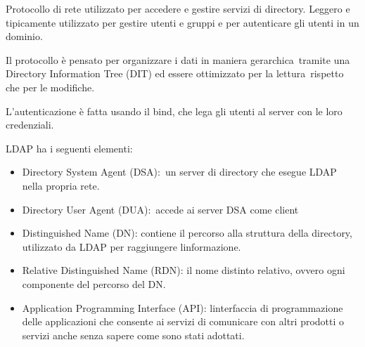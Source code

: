 \documentclass[
]{article}
\providecommand{\tightlist}{%
  \setlength{\itemsep}{0pt}\setlength{\parskip}{0pt}}
\begin{document}
{Protocollo di rete utilizzato per accedere e gestire servizi di
directory. Leggero e tipicamente utilizzato per gestire utenti e gruppi
e per autenticare gli utenti in un dominio.}

{}

{Il protocollo è pensato per }{organizzare i dati in maniera
gerarchica}{~tramite una Directory Information Tree (DIT) ed essere
}{ottimizzato per la lettura}{~rispetto che per le modifiche.}

{L'autenticazione è fatta usando il }{bind}{, che lega gli utenti al
server con le loro credenziali.}

{}

{}

{LDAP ha i seguenti elementi:}

\begin{itemize}
\tightlist
\item
  {Directory System Agent (DSA):}{~un server di directory che esegue
  LDAP nella propria rete.}
\end{itemize}

{}

\begin{itemize}
\tightlist
\item
  {Directory User Agent (DUA):}{~accede ai server DSA come client}
\end{itemize}

{}

\begin{itemize}
\tightlist
\item
  {Distinguished Name (DN)}{: contiene il percorso alla struttura della
  directory, utilizzato da LDAP per raggiungere
  l\textquotesingle informazione.}
\end{itemize}

{}

\begin{itemize}
\tightlist
\item
  {Relative Distinguished Name (RDN)}{: il nome distinto relativo,
  ovvero ogni componente del percorso del DN.}
\end{itemize}

{}

\begin{itemize}
\tightlist
\item
  {Application Programming Interface (API)}{:
  l\textquotesingle interfaccia di programmazione delle applicazioni che
  consente ai servizi di comunicare con altri prodotti o servizi anche
  senza sapere come sono stati adottati.}
\end{itemize}
\end{document}
